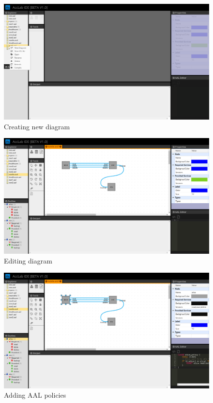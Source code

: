 \begin{figure}[!ht]
      \center
      \includegraphics[width=15cm,angle=0]{assets/gui/interface1.png}
      \caption{Creating new diagram}
\end{figure}


\begin{figure}[!ht]
      \center
      \includegraphics[width=15cm,angle=0]{assets/gui/interface2.png}
      \caption{Editing diagram}
\end{figure}

\begin{figure}[!ht]
      \center
      \includegraphics[width=15cm,angle=0]{assets/gui/interface3.png}
      \caption{Adding AAL policies}
\end{figure}

